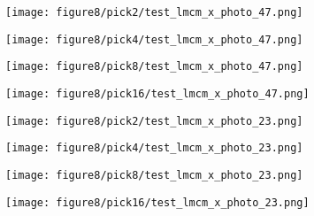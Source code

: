 \begin{figure*}[htbp]
    \centering


    \begin{minipage}{0.21\textwidth}
        \texttt{[image: figure8/pick2/test\_lmcm\_x\_photo\_47.png]}
    \end{minipage}\hspace{0.1cm}%
    \begin{minipage}{0.21\textwidth}
        \texttt{[image: figure8/pick4/test\_lmcm\_x\_photo\_47.png]}
    \end{minipage}\hspace{0.1cm}%
    \begin{minipage}{0.21\textwidth}
        \texttt{[image: figure8/pick8/test\_lmcm\_x\_photo\_47.png]}
    \end{minipage}\hspace{0.1cm}%
    \begin{minipage}{0.21\textwidth}
        \texttt{[image: figure8/pick16/test\_lmcm\_x\_photo\_47.png]}
    \end{minipage}\hspace{0.1cm}%

    \vspace{-0.1cm}

    \begin{minipage}{0.21\textwidth}
        \texttt{[image: figure8/pick2/test\_lmcm\_x\_photo\_23.png]}
    \end{minipage}\hspace{0.1cm}%
    \begin{minipage}{0.21\textwidth}
        \texttt{[image: figure8/pick4/test\_lmcm\_x\_photo\_23.png]}
    \end{minipage}\hspace{0.1cm}%
    \begin{minipage}{0.21\textwidth}
        \texttt{[image: figure8/pick8/test\_lmcm\_x\_photo\_23.png]}
    \end{minipage}\hspace{0.1cm}%
    \begin{minipage}{0.21\textwidth}
        \texttt{[image: figure8/pick16/test\_lmcm\_x\_photo\_23.png]}
    \end{minipage}\hspace{0.1cm}%

    \vspace{-0.1cm}


\end{figure*}
